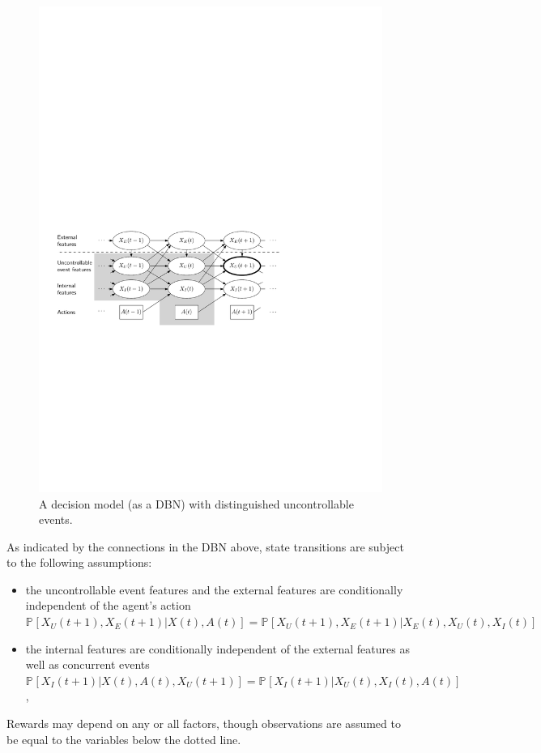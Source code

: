 \documentclass[10pt]{article}
\newcommand{\PP}[2][]{\mathbb{P\!}_{#1}\left[#2\right]}
\begin{document}
\begin{figure}[h]%
\centering
  \includegraphics[width=\columnwidth]{bayes-dsep2}
\caption{A decision model (as a DBN) with distinguished uncontrollable events.}
  \label{Fig:D-separation}
\end{figure}

\noindent As indicated by the connections in the DBN above, state transitions are subject to the following assumptions:
\begin{itemize}%
\item the uncontrollable event features and the external features are conditionally independent of the agent's action $\PP{X_{U}(t+1),X_{E}(t+1)|X(t),A(t)} = \PP{X_{U}(t+1),X_{E}(t+1)|X_{E}(t),X_{U}(t),X_{I}(t)}$
\item the internal features are conditionally independent of the external features as well as concurrent events
$\PP{X_{I}(t\!+\!1)|X(t),A(t),X_{U}(t\!+\!1)} = \PP{X_{I}(t\!+\!1)|X_{U}(t),X_{I}(t),A(t)}$,
\end{itemize}
Rewards may depend on any or all factors, though observations are assumed to be equal to the variables below the dotted line.
\end{document}
